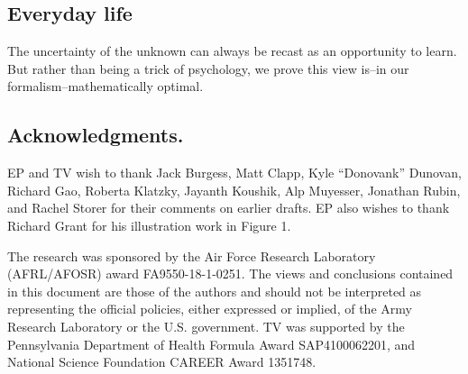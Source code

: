 \documentclass[9pt,twocolumn,twoside]{pnas-new}
\begin{document}
\subsection*{Everyday life} The uncertainty of the unknown can always be recast as an opportunity to learn. But rather than being a trick of psychology, we prove this view is--in our formalism--mathematically optimal.


\subsection*{Acknowledgments.}
EP and TV wish to thank Jack Burgess, Matt Clapp, Kyle ``Donovank'' Dunovan, Richard Gao, Roberta Klatzky, Jayanth Koushik, Alp Muyesser, Jonathan Rubin, and Rachel Storer for their comments on earlier drafts. EP also wishes to thank Richard Grant for his illustration work in Figure 1.

The research was sponsored by the Air Force Research Laboratory (AFRL/AFOSR) award FA9550-18-1-0251. The views and conclusions contained in this document are those of the authors and should not be interpreted as representing the official policies, either expressed or implied, of the Army Research Laboratory or the U.S. government. TV was supported by the Pennsylvania Department of Health Formula Award SAP4100062201, and National Science Foundation CAREER Award 1351748.




 
\end{document}
